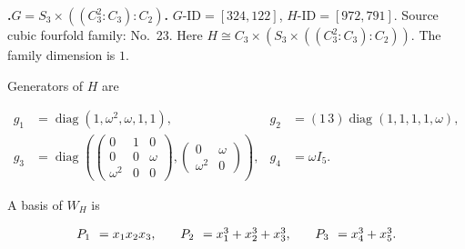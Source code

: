 \documentclass[12pt]{amsart}
\makeatletter
\numberwithin{equation}{section}
\theoremstyle{plain}
\theoremstyle{definition}
\theoremstyle{remark}
\DeclareMathOperator{\diag}{diag}
\newcommand{\PBasisLabel}[1]{\mathrlap{P_{#1}}\phantom{P_{99}}}
\newenvironment{SecEightAlignedBasis}[1]{%
  \begingroup\renewcommand{\arraystretch}{1.18}%
  \[\begin{array}{@{}#1@{}}%
}{\end{array}\]\endgroup}
\newenvironment{familydisplay}{%
  \begingroup
  \setlength{\arraycolsep}{1.35pt}%
  \renewcommand{\arraystretch}{0.96}%
  \setlength{\jot}{2pt}%
}{\endgroup}
\newcommand{\smat}[1]{\left(\begin{smallmatrix}#1\end{smallmatrix}\right)}
\makeatother
\begin{document}
\par{}\medskip\noindent\textbf{.\enspace $G=S_3\times((C_3^2:C_3):C_2)$.}\label{fam:threefold-no-4}
$G\text{-ID}=[324,122]$, $H\text{-ID}=[972,791]$.
Source cubic fourfold family: No.~23.  Here $H\cong C_3\times(S_3\times((C_3^2:C_3):C_2))$.
The family dimension is $1$.
\par\smallskip\noindent Generators of $H$ are\par\nopagebreak
\begin{familydisplay}
\begin{align*}
g_1&=\diag(1,\omega^2,\omega,1,1),
&
g_2&=(1\,3)\diag(1,1,1,1,\omega),\\
g_3&=\diag\!\left(
\smat{0&1&0\\0&0&\omega\\\omega^2&0&0},
\smat{0&\omega\\\omega^2&0}
\right),
&
g_4&=\omega I_5.
\end{align*}
\end{familydisplay}
\par\smallskip\noindent A basis of $W_H$ is\par\nopagebreak
\begin{familydisplay}
\begin{SecEightAlignedBasis}{l@{\qquad}l@{\qquad}l}
\PBasisLabel{1}=x_{1}x_{2}x_{3}, &
\PBasisLabel{2}=x_{1}^{3}+x_{2}^{3}+x_{3}^{3}, &
\PBasisLabel{3}=x_{4}^{3}+x_{5}^{3}.
\end{SecEightAlignedBasis}
\end{familydisplay}
\end{document}
